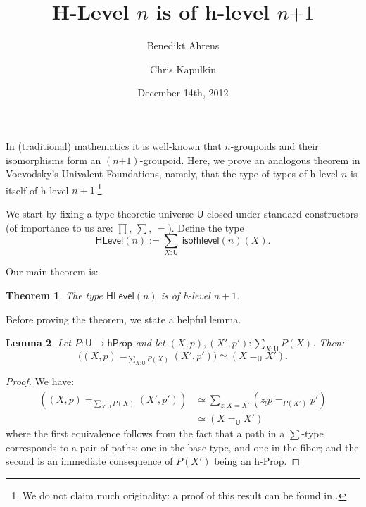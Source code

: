 \documentclass[11pt]{amsart}
\theoremstyle{plain}
\newtheorem{theorem}{Theorem}
\newtheorem{lemma}[theorem]{Lemma}
\theoremstyle{definition}
\newcommand{\HLevel}{\mathsf{HLevel}}
\newcommand{\hProp}{\mathsf{hProp}}
\newcommand{\isofhlevel}{\mathsf{isofhlevel}}
\newcommand{\U}{\mathsf{U}}
\newcommand{\oftype}{\! : \!}
\begin{document}
\title{H-Level $n$ is of h-level $n\mbox{+}1$}

\author{Benedikt Ahrens}

\author{Chris Kapulkin}

\date{December 14th, 2012}
\maketitle

In (traditional) mathematics it is well-known that $n$-groupoids and their isomorphisms form an $(n\mbox{+}1)$-groupoid. Here, we prove an analogous theorem in Voevodsky's Univalent Foundations, namely, that the type of types of h-level $n$ is itself of h-level $n+1$.\footnote{We do not claim much originality: a proof of this result can be found in \cite[Section~8.7]{warren-pelayo:univalent-foundations-paper}.}

We start by fixing a type-theoretic universe $\U$ closed under standard constructors (of importance to us are: $\prod$, $\sum$, $=$). Define the type
 \[\HLevel(n) := \sum_{X : \U} \ \isofhlevel(n)(X). \]

Our main theorem is:

\begin{theorem}\label{main_thm}
 The type $\HLevel(n)$ is of h-level $n+1$.
\end{theorem}

Before proving the theorem, we state a helpful lemma.

\begin{lemma}\label{Id_of_Sigma}
 Let $P \colon \U \to \hProp$ and let $(X, p), (X', p') \oftype \sum\limits_{X : \U} P(X)$. Then:
 \[ \big( (X, p) =_{\sum\limits_{X : \U} P(X)} (X', p')\big) \simeq (X =_{\U} X').\]
\end{lemma}

\begin{proof}
 We have:
 \begin{equation*}\begin{split}
 ((X, p) =_{\sum\limits_{X : \U} P(X)} (X', p')) & \simeq \sum_{z : X = X'} (z_!p =_{P(X')} p') \\
  & \simeq (X =_{\U} X')
 \end{split}
 \end{equation*}
 where the first equivalence follows from the fact that a path in a $\sum$-type corresponds to a pair of paths: one in the base type, and one in the fiber; and the second is an immediate consequence of $P(X')$ being an h-Prop.
\end{proof}
\end{document}
